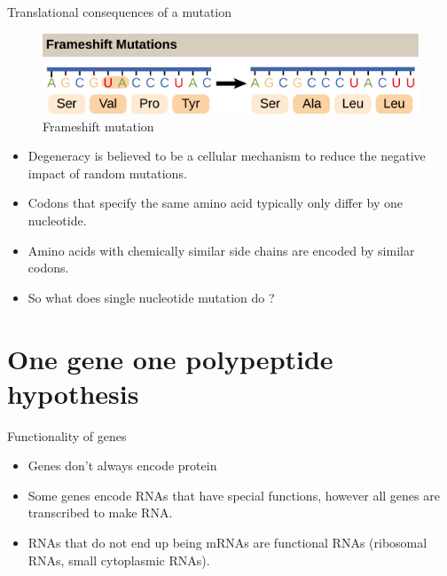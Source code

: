 \documentclass[11pt,dvipsnames,ignorenonframetext,aspectratio=169]{beamer}
\providecommand{\tightlist}{%
  \setlength{\itemsep}{0pt}\setlength{\parskip}{0pt}}
\begin{document}
\begin{frame}{Translational consequences of a mutation}
\protect\hypertarget{translational-consequences-of-a-mutation}{}

\begin{figure}
\includegraphics[width=0.45\linewidth]{./../images/frameshift_mutation} \caption{Frameshift mutation}\label{fig:frameshift-mutation}
\end{figure}

\begin{itemize}
\tightlist
\item
  Degeneracy is believed to be a cellular mechanism to reduce the
  negative impact of random mutations.
\item
  Codons that specify the same amino acid typically only differ by one
  nucleotide.
\item
  Amino acids with chemically similar side chains are encoded by similar
  codons.
\item
  So what does single nucleotide mutation do ?
\end{itemize}

\end{frame}

\hypertarget{one-gene-one-polypeptide-hypothesis}{%
\section{One gene one polypeptide
hypothesis}\label{one-gene-one-polypeptide-hypothesis}}

\begin{frame}{Functionality of genes}
\protect\hypertarget{functionality-of-genes}{}

\begin{itemize}
\tightlist
\item
  Genes don't always encode protein
\item
  Some genes encode RNAs that have special functions, however all genes
  are transcribed to make RNA.
\item
  RNAs that do not end up being mRNAs are functional RNAs (ribosomal
  RNAs, small cytoplasmic RNAs).
\end{itemize}

\end{frame}
\end{document}
